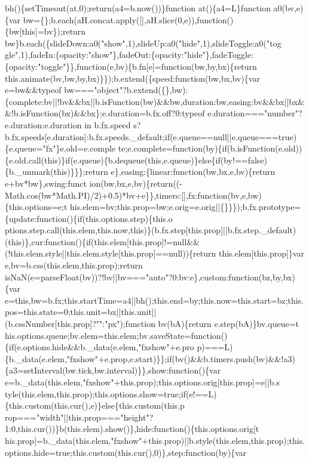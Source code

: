 \begin{DoxyCode}
{       bh()\{setTimeout(at,0);return(a4=b.now())\}function at()\{a4=L\}function a0(bv,e)\{var
       bw=\{\};b.each(aH.concat.apply([],aH.slice(0,e)),function()\{bw[this]=bv\});return
       bw\}b.each(\{slideDown:a0("show",1),slideUp:a0("hide",1),slideToggle:a0("tog
      gle",1),fadeIn:\{opacity:"show"\},fadeOut:\{opacity:"hide"\},fadeToggle:\{opacity:"toggle"\}\},function(e,bv)\{b.fn[e]=function(bw,by,bx)\{return this.animate(bv,bw,by,bx)\}\});b.extend(\{speed:function(bw,bx,bv)\{var
       e=bw&&typeof
       bw==="object"?b.extend(\{\},bw):\{complete:bv||!bv&&bx||b.isFunction(bw)&&bw,duration:bw,easing:bv&&bx||bx&&!b.isFunction(bx)&&bx\};e.duration=b.fx.off?0:typeof e.duration==="number"?e.duration:e.duration in
       b.fx.speed
      s?b.fx.speeds[e.duration]:b.fx.speeds.\_default;if(e.queue==null||e.queue===true)\{e.queue="fx"\}e.old=e.comple
      te;e.complete=function(by)\{if(b.isFunction(e.old))\{e.old.call(this)\}if(e.queue)\{b.dequeue(this,e.queue)\}else\{if(by!==false)\{b.\_unmark(this)\}\}\};return e\},easing:\{linear:function(bw,bx,e,bv)\{return
       e+bv*bw\},swing:funct
      ion(bw,bx,e,bv)\{return((-Math.cos(bw*Math.PI)/2)+0.5)*bv+e\}\},timers:[],fx:function(bv,e,bw)\{this.options=e;t
      his.elem=bv;this.prop=bw;e.orig=e.orig||\{\}\}\});b.fx.prototype=\{update:function()\{if(this.options.step)\{this.o
      ptions.step.call(this.elem,this.now,this)\}(b.fx.step[this.prop]||b.fx.step.\_default)(this)\},cur:function()\{if(this.elem[this.prop]!=null&&(!this.elem.style||this.elem.style[this.prop]==null))\{return
       this.elem[this.prop]\}var e,bv=b.css(this.elem,this.prop);return
       isNaN(e=parseFloat(bv))?!bv||bv==="auto"?0:bv:e\},custom:function(bz,by,bx)\{var
       e=this,bw=b.fx;this.startTime=a4||bh();this.end=by;this.now=this.start=bz;this.pos=this.state=0;this.unit=bx||this.unit||(b.cssNumber[this.prop]?"":"px");function bv(bA)\{return
       e.step(bA)\}bv.queue=t
      his.options.queue;bv.elem=this.elem;bv.saveState=function()\{if(e.options.hide&&b.\_data(e.elem,"fxshow"+e.pro
      p)===L)\{b.\_data(e.elem,"fxshow"+e.prop,e.start)\}\};if(bv()&&b.timers.push(bv)&&!a3)\{a3=setInterval(bw.tick,bw.interval)\}\},show:function()\{var
       e=b.\_data(this.elem,"fxshow"+this.prop);this.options.orig[this.prop]=e||b.s
      tyle(this.elem,this.prop);this.options.show=true;if(e!==L)\{this.custom(this.cur(),e)\}else\{this.custom(this.p
      rop==="width"||this.prop==="height"?1:0,this.cur())\}b(this.elem).show()\},hide:function()\{this.options.orig[t
      his.prop]=b.\_data(this.elem,"fxshow"+this.prop)||b.style(this.elem,this.prop);this.options.hide=true;this.custom(this.cur(),0)\},step:function(by)\{var
}
\end{DoxyCode}
